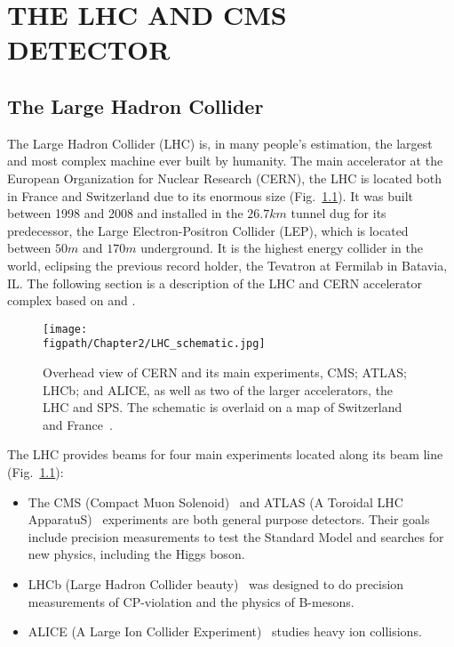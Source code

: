 %
%
%



\chapter{\uppercase {The LHC and CMS Detector}}

\section{The Large Hadron Collider}

The Large Hadron Collider (LHC) \cite{Breskin:1244506} is, in many people's estimation, the largest and most complex machine ever built by humanity. The main accelerator at the European Organization for Nuclear Research (CERN), the LHC is located both in France and Switzerland due to its enormous size (Fig.~\ref{fig:LHC_schematic}). It was built between 1998 and 2008 and installed in the $26.7\unit{km}$ tunnel dug for its predecessor, the Large Electron-Positron Collider (LEP), which is located between $50\unit{m}$ and $170\unit{m}$ underground. It is the highest energy collider in the world, eclipsing the previous record holder, the Tevatron at Fermilab in Batavia, IL. The following section is a description of the LHC and CERN accelerator complex based on \cite{LHCmachine} and \cite{Breskin:1244506}.

\begin{figure}[!hbt]
	\centering
	\texttt{[image: \\figpath/Chapter2/LHC\_schematic.jpg]}
	\caption{Overhead view of CERN and its main experiments, CMS; ATLAS; LHCb; and ALICE, as well as two of the larger accelerators, the LHC and SPS. The schematic is overlaid on a map of Switzerland and France~\cite{LHC-schematic}.}
	\label{fig:LHC_schematic}
\end{figure}

The LHC provides beams for four main experiments located along its beam line (Fig.~\ref{fig:LHC_schematic}):
\begin{itemize}
	\item The CMS (Compact Muon Solenoid)~\cite{Chatrchyan:2008aa} and ATLAS (A Toroidal LHC ApparatuS)~\cite{1748-0221-3-08-S08003} experiments are both general purpose detectors. Their goals include precision measurements to test the Standard Model and searches for new physics, including the Higgs boson.
	\item LHCb (Large Hadron Collider beauty)~\cite{Alves:2008zz} was designed to do precision measurements of CP-violation and the physics of B-mesons.
	\item ALICE (A Large Ion Collider Experiment)~\cite{Aamodt:2008zz} studies heavy ion collisions.
\end{itemize}


